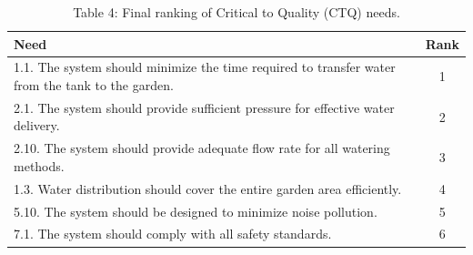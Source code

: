 \documentclass[11pt]{article}
\begin{document}
\begin{table}[H]
\centering
\caption*{Table 4: Final ranking of Critical to Quality (CTQ) needs.}
\label{table:4}
\begin{tabular}{|p{12cm}|c|}
\hline
\textbf{Need} & \textbf{Rank} \\
\hline
1.1. The system should minimize the time required to transfer water from the tank to the garden. & 1 \\
2.1. The system should provide sufficient pressure for effective water delivery. & 2 \\
2.10. The system should provide adequate flow rate for all watering methods. & 3 \\
1.3. Water distribution should cover the entire garden area efficiently. & 4 \\
5.10. The system should be designed to minimize noise pollution. & 5 \\
7.1. The system should comply with all safety standards. & 6 \\
\hline
\end{tabular}
\end{table}
\end{document}

